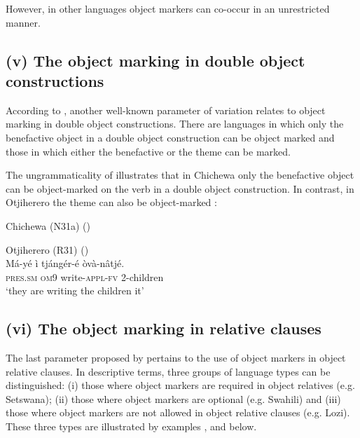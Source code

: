 \documentclass[output=paper]{langscibook}
\begin{document}
However, in other languages object markers can co-occur in an unrestricted manner.

 \subsection{(v) The object marking in double object constructions}

According to \citet{MartenKula2012}, another well-known parameter of variation relates to object marking in double object constructions. There are languages in which only the benefactive object in a double object construction can be object marked and those in which either the benefactive or the theme can be marked. 

The ungrammaticality of  illustrates that in Chichewa only the benefactive object can be object-marked on the verb in a double object construction. In contrast, in Otjiherero the theme can also be object-marked :

\ea\label{ex:ngunga:16}  Chichewa (N31a)    (\citealt[247]{MartenKula2012})\\
\z
\z

\ea\label{ex:ngunga:17}  Otjiherero (R31)  
(\citealt[247]{MartenKula2012})\\
\gll  Má-yé  ì  tjángér-é  òvà-nâtjé.\\
    \textsc{pres}.\textsc{sm}  \textsc{om}9 write-{\textsc{appl}-\textsc{fv}} 2-children\\
\glt  ‘they are writing the children it’
\z

\subsection{(vi) The object marking in relative clauses}

The last parameter proposed by \citet{MartenKula2012} pertains to the use of object markers in object relative clauses. In descriptive terms, three groups of language types can be distinguished: (i) those where object markers are required in object relatives (e.g. Setswana); (ii) those where object markers are optional (e.g. Swahili) and (iii) those where object markers are not allowed in object relative clauses (e.g. Lozi). These three types are illustrated by examples ,  and  below.
\end{document}
